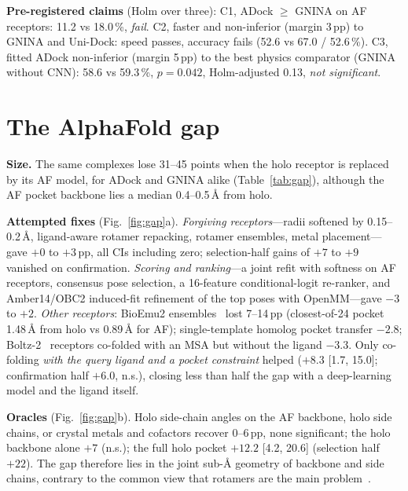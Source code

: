 \documentclass[10pt,a4paper,twocolumn]{article}
\newcommand{\pp}{\,pp}
\begin{document}
\textbf{Pre-registered claims} (Holm over three): C1, ADock $\geq$ GNINA on AF receptors: 11.2 vs 18.0\,\%,
\emph{fail}. C2, faster and non-inferior (margin 3\pp) to GNINA and Uni-Dock: speed passes, accuracy fails (52.6 vs
67.0 / 52.6\,\%). C3, fitted ADock non-inferior (margin 5\pp) to the best physics comparator (GNINA without CNN):
58.6 vs 59.3\,\%, $p=0.042$, Holm-adjusted 0.13, \emph{not significant}.

\section{The AlphaFold gap}
\label{sec:gap}

\textbf{Size.} The same complexes lose 31--45 points when the holo receptor is replaced by its AF model, for ADock and
GNINA alike (Table~\ref{tab:gap}), although the AF pocket backbone lies a median 0.4--0.5\,\AA{} from holo.

\begin{table}[t]
\centering\footnotesize
\caption{Top-1 success (\%, seed 0) with experimental vs predicted receptors. RnP: Runs N' Poses post-2023 ($n=222$).
PB2: PoseBusters V2 with AFDB / ESMFold receptors ($n=268$).}
\label{tab:gap}
\resizebox{\columnwidth}{!}{}
\end{table}


\textbf{Attempted fixes} (Fig.~\ref{fig:gap}a). \emph{Forgiving receptors}---radii softened by 0.15--0.2\,\AA,
ligand-aware rotamer repacking, rotamer ensembles, metal placement---gave $+0$ to $+3$\pp{}, all CIs including zero;
selection-half gains of $+7$ to $+9$ vanished on confirmation. \emph{Scoring and ranking}---a joint refit with
softness on AF receptors, consensus pose selection, a 16-feature conditional-logit re-ranker, and Amber14/OBC2
induced-fit refinement of the top poses with OpenMM---gave $-3$ to $+2$. \emph{Other receptors}: BioEmu2
ensembles~\cite{lewis2025} lost 7--14\pp{} (closest-of-24 pocket 1.48\,\AA{} from holo vs 0.89\,\AA{} for AF);
single-template homolog pocket transfer $-2.8$; Boltz-2~\cite{boltz} receptors co-folded with an MSA but without the
ligand $-3.3$. Only co-folding \emph{with the query ligand and a pocket constraint} helped ($+8.3$ [1.7, 15.0];
confirmation half $+6.0$, n.s.), closing less than half the gap with a deep-learning model and the ligand itself.

\textbf{Oracles} (Fig.~\ref{fig:gap}b). Holo side-chain angles on the AF backbone, holo side chains, or crystal metals
and cofactors recover 0--6\pp, none significant; the holo backbone alone $+7$ (n.s.); the full holo pocket
$+12.2$ [4.2, 20.6] (selection half $+22$). The gap therefore lies in the joint sub-\AA{} geometry of backbone and
side chains, contrary to the common view that rotamers are the main problem~\cite{holcomb2023}.
\end{document}
